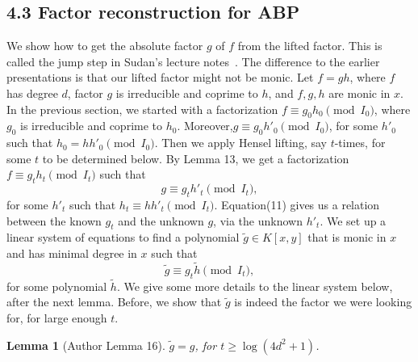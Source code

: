 \documentclass[10pt,a4paper]{article}
\newtheorem{ntlemma}[nttheorem]{Lemma}
\begin{document}
\subsection*{4.3 Factor reconstruction for ABP}
We show how to get the absolute factor $g$ of $f$ from the lifted factor. This is called the jump step in Sudan's lecture notes~\cite{ref18}. The difference to the earlier presentations is that our lifted factor might not be monic.
Let $f=gh$, where $f$ has degree $d$, factor $g$ is irreducible and coprime to $h$, and $f,g,h$ are monic in $x$. In the previous section, we started with a factorization $f\equiv g_0h_0\pmod{I_0}$, where $g_0$ is irreducible and coprime to $h_0$. Moreover,$g\equiv g_0h'_0\pmod{I_0}$, for some $h'_0$ such that $h_0=hh'_0\pmod{I_0}$.
Then we apply Hensel lifting, say $t$-times, for some $t$ to be determined below. By Lemma 13, we get a factorization $f\equiv g_th_t\pmod{I_t}$ such that
\begin{equation}g\equiv g_th'_t\pmod{I_t},\tag{11}\end{equation}
for some $h'_t$ such that $h_t\equiv hh'_t\pmod{I_t}$.
Equation(11) gives us a relation between the known $g_t$ and the unknown $g$, via the unknown $h'_t$. We set up a linear system of equations to find a polynomial $\widetilde g\in K[x,y]$ that is monic in $x$ and has minimal degree in $x$ such that
\begin{equation}\widetilde g\equiv g_t\widetilde h\pmod{I_t},\tag{12}\end{equation}
for some polynomial $\widetilde h$. We give some more details to the linear system below, after the next lemma. Before, we show that $\widetilde g$ is indeed the factor we were looking for, for large enough $t$.
\begin{ntlemma}[Author Lemma 16]
$\widetilde g=g$, for $t\geq\log(4d^2+1)$.
\end{ntlemma}
\end{document}
